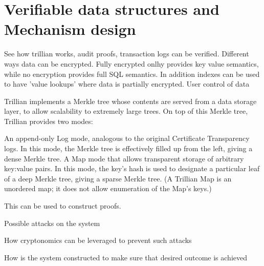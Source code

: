\documentclass[preprint,12pt]{elsarticle}
\begin{document}
\section{Verifiable data structures and Mechanism design}
See how trillian works, audit proofs, transaction logs can be verified. Different ways data can be encrypted.  Fully encrypted onlhy provides key value semantics, while no encryption provides full SQL semantics. In addition indexes can be used to have 'value lookups' where data is partially encrypted. User control of data

Trillian implements a Merkle tree whose contents are served from a data storage layer, to allow scalability to extremely large trees. On top of this Merkle tree, Trillian provides two modes:

An append-only Log mode, analogous to the original Certificate Transparency logs. In this mode, the Merkle tree is effectively filled up from the left, giving a dense Merkle tree.
A Map mode that allows transparent storage of arbitrary key:value pairs. In this mode, the key's hash is used to designate a particular leaf of a deep Merkle tree, giving a sparse Merkle tree. (A Trillian Map is an unordered map; it does not allow enumeration of the Map's keys.)

This can be used to construct proofs.

Possible attacks on the system

How cryptonomics can be leveraged to prevent such attacks

How is the system constructed to make sure that desired outcome is achieved
\end{document}
